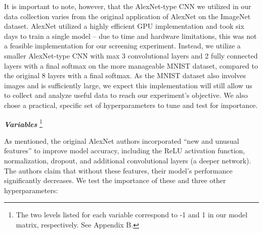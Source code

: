 \documentclass[12pt]{article}
\begin{document}
It is important to note, however, that the AlexNet-type CNN we utilized in our data collection varies from the original application of AlexNet on the ImageNet dataset. AlexNet utilized a highly efficient GPU implementation and took six days to train a single model – due to time and hardware limitations, this was not a feasible implementation for our screening experiment. Instead, we utilize a smaller AlexNet-type CNN with max 3 convolutional layers and 2 fully connected layers with a final softmax on the more manageable MNIST dataset, compared to the original 8 layers with a final softmax. As the MNIST dataset also involves images and is sufficiently large, we expect  this implementation will still allow us to collect and analyze useful data to reach our experiment’s objective. We also chose a practical, specific set of hyperparameters to tune and test for importance.  

\vspace{.5pc}
\newpage
\noindent \textbf{\textit{Variables}}
\footnote{The two levels listed for each variable correspond to -1 and 1 in our model matrix, respectively. See Appendix B.}
\vspace{.1pc}
 
As mentioned, the original AlexNet authors incorporated “new and unusual features” to improve model accuracy, including the ReLU activation function, normalization, dropout, and additional convolutional layers (a deeper network). The authors claim that without these features, their model’s performance significantly decreases. We test the importance of these and three other hyperparameters: 
\end{document}
